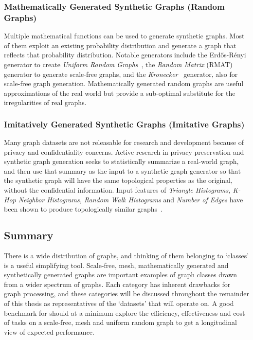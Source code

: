 \subsubsection{Mathematically Generated Synthetic Graphs (Random Graphs)}
Multiple mathematical functions can be used to generate synthetic graphs.
Most of them exploit an existing probability distribution and generate a graph that reflects that probability distribution. 
Notable generators include the Erd\H{o}s-R\'enyi generator to create \textit{Uniform Random Graphs}~\cite{Erdhos1960}, the \textit{Random Matrix} (RMAT)~\cite{Chakrabarti2004} generator to generate scale-free graphs, and the \textit{Kronecker}~\cite{Leskovec2010} generator, also for scale-free graph generation. 
Mathematically generated random graphs are useful approximations of the real world but provide a sub-optimal substitute for the irregularities of real graphs. 

\subsubsection{Imitatively Generated Synthetic Graphs (Imitative Graphs)}
Many graph datasets are not releasable for research and development because of privacy and confidentiality concerns. 
Active research in privacy preservation and synthetic graph generation seeks to statistically summarize a real-world graph, and then use that summary as the input to a synthetic graph generator so that the synthetic graph will have the same topological properties as the original, without the confidential information. 
Input features of \textit{Triangle Histograms, K-Hop Neighbor Histograms, Random Walk Histograms} and \textit{Number of Edges} have been shown to produce topologically similar graphs~\cite{Zahirnia2024}.


\subsection{Summary}
There is a wide distribution of graphs, and thinking of them belonging to `classes' is a useful simplifying tool.
Scale-free, mesh, mathematically generated and  synthetically generated graphs are important examples of graph classes drawn from a wider spectrum of graphs. 
Each category has inherent drawbacks for graph processing, and these categories will be discussed throughout the remainder of this thesis as representatives of the `datasets' that \gai will operate on.
A good benchmark for \gai should at a minimum explore the efficiency, effectiveness and cost of \gai tasks on a scale-free, mesh and uniform random graph to get a longitudinal view of expected performance. 

